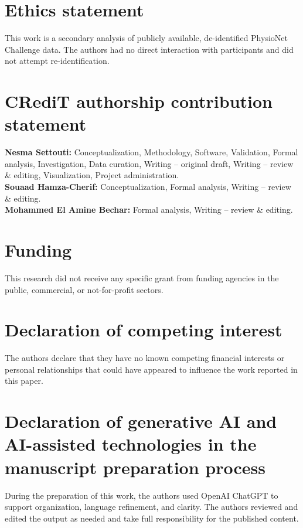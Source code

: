 \documentclass[preprint,12pt]{elsarticle}
\begin{document}
\section*{Ethics statement}
This work is a secondary analysis of publicly available, de-identified PhysioNet Challenge data. The authors had no direct interaction with participants and did not attempt re-identification.

\section*{CRediT authorship contribution statement}
\textbf{Nesma Settouti:} Conceptualization, Methodology, Software, Validation, Formal analysis, Investigation, Data curation, Writing -- original draft, Writing -- review \& editing, Visualization, Project administration.\\
\textbf{Souaad Hamza-Cherif:} Conceptualization, Formal analysis, Writing -- review \& editing.\\
\textbf{Mohammed El Amine Bechar:} Formal analysis, Writing -- review \& editing.

\section*{Funding}
This research did not receive any specific grant from funding agencies in the public, commercial, or not-for-profit sectors.

\section*{Declaration of competing interest}
The authors declare that they have no known competing financial interests or personal relationships that could have appeared to influence the work reported in this paper.

\section*{Declaration of generative AI and AI-assisted technologies in the manuscript preparation process}
During the preparation of this work, the authors used OpenAI ChatGPT to support organization, language refinement, and clarity. The authors reviewed and edited the output as needed and take full responsibility for the published content.



\end{document}
